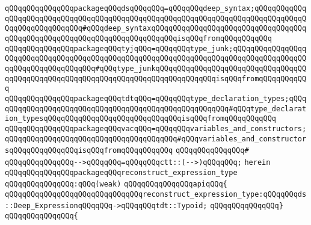\verb|qQQqqQQqqQQqqQQqpackageqQQqdsqQQqqQQq=qQQqqQQqdeep_syntax;qQQqqQQqqQQqqQQqqQQqqQQqqQQqqQQqqQQqqQQqqQQqqQQqqQQqqQQqqQQqqQQqqQQqqQQqqQQqqQQqqQQqqQQqqQQqqQQqqQQq#qQQqdeep_syntaxqQQqqQQqqQQqqQQqqQQqqQQqqQQqqQQqqQQqqQQqqQQqqQQqqQQqqQQqqQQqqQQqqQQqqQQqqQQqisqQQqfromqQQqqQQqqQQq|\newline
\verb|qQQqqQQqqQQqqQQqpackageqQQqtyjqQQq=qQQqqQQqtype_junk;qQQqqQQqqQQqqQQqqQQqqQQqqQQqqQQqqQQqqQQqqQQqqQQqqQQqqQQqqQQqqQQqqQQqqQQqqQQqqQQqqQQqqQQqqQQqqQQqqQQqqQQqqQQq#qQQqtype_junkqQQqqQQqqQQqqQQqqQQqqQQqqQQqqQQqqQQqqQQqqQQqqQQqqQQqqQQqqQQqqQQqqQQqqQQqqQQqqQQqqQQqisqQQqfromqQQqqQQqqQQq|\newline
\verb|qQQqqQQqqQQqqQQqpackageqQQqtdtqQQq=qQQqqQQqtype_declaration_types;qQQqqQQqqQQqqQQqqQQqqQQqqQQqqQQqqQQqqQQqqQQqqQQqqQQqqQQq#qQQqtype_declaration_typesqQQqqQQqqQQqqQQqqQQqqQQqqQQqqQQqisqQQqfromqQQqqQQqqQQq|\newline
\verb|qQQqqQQqqQQqqQQqpackageqQQqvacqQQq=qQQqqQQqvariables_and_constructors;qQQqqQQqqQQqqQQqqQQqqQQqqQQqqQQqqQQqqQQq#qQQqvariables_and_constructorsqQQqqQQqqQQqqQQqisqQQqfromqQQqqQQqqQQq|\newline
\verb|qQQqqQQqqQQqqQQq#|\newline
\verb|qQQqqQQqqQQqqQQq-->qQQqqQQq=qQQqqQQqctt::(-->)qQQqqQQq;|\newline
\verb|herein|\newline
\newline
\verb|qQQqqQQqqQQqqQQqpackageqQQqreconstruct_expression_type|\newline
\verb|qQQqqQQqqQQqqQQq:qQQq(weak)|\newline
\verb|qQQqqQQqqQQqqQQqapiqQQq{|\newline
\verb|qQQqqQQqqQQqqQQqqQQqqQQqqQQqqQQqreconstruct_expression_type:qQQqqQQqds::Deep_ExpressionqQQqqQQq->qQQqqQQqtdt::Typoid;|\newline
\verb|qQQqqQQqqQQqqQQq}|\newline
\verb|qQQqqQQqqQQqqQQq{|\newline
